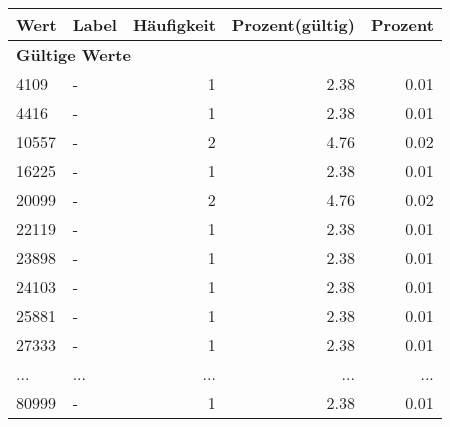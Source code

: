      \begin{longtable}{lXrrr}
     \toprule
     \textbf{Wert} & \textbf{Label} & \textbf{Häufigkeit} & \textbf{Prozent(gültig)} & \textbf{Prozent} \\
     \endhead
     \midrule
     \multicolumn{5}{l}{\textbf{Gültige Werte}}\\
        4109 & \multicolumn{1}{X}{-} & %
          \num{1} &
          \num[round-mode=places,round-precision=2]{2,38} &
          \num[round-mode=places,round-precision=2]{0,01} \\
        4416 & \multicolumn{1}{X}{-} & %
          \num{1} &
          \num[round-mode=places,round-precision=2]{2,38} &
          \num[round-mode=places,round-precision=2]{0,01} \\
        10557 & \multicolumn{1}{X}{-} & %
          \num{2} &
          \num[round-mode=places,round-precision=2]{4,76} &
          \num[round-mode=places,round-precision=2]{0,02} \\
        16225 & \multicolumn{1}{X}{-} & %
          \num{1} &
          \num[round-mode=places,round-precision=2]{2,38} &
          \num[round-mode=places,round-precision=2]{0,01} \\
        20099 & \multicolumn{1}{X}{-} & %
          \num{2} &
          \num[round-mode=places,round-precision=2]{4,76} &
          \num[round-mode=places,round-precision=2]{0,02} \\
        22119 & \multicolumn{1}{X}{-} & %
          \num{1} &
          \num[round-mode=places,round-precision=2]{2,38} &
          \num[round-mode=places,round-precision=2]{0,01} \\
        23898 & \multicolumn{1}{X}{-} & %
          \num{1} &
          \num[round-mode=places,round-precision=2]{2,38} &
          \num[round-mode=places,round-precision=2]{0,01} \\
        24103 & \multicolumn{1}{X}{-} & %
          \num{1} &
          \num[round-mode=places,round-precision=2]{2,38} &
          \num[round-mode=places,round-precision=2]{0,01} \\
        25881 & \multicolumn{1}{X}{-} & %
          \num{1} &
          \num[round-mode=places,round-precision=2]{2,38} &
          \num[round-mode=places,round-precision=2]{0,01} \\
        27333 & \multicolumn{1}{X}{-} & %
          \num{1} &
          \num[round-mode=places,round-precision=2]{2,38} &
          \num[round-mode=places,round-precision=2]{0,01} \\
       ... & ... & ... & ... & ... \\
        80999 & \multicolumn{1}{X}{-} & %
          \num{1} &
          \num[round-mode=places,round-precision=2]{2,38} &
          \num[round-mode=places,round-precision=2]{0,01} \\


\end{longtable}
